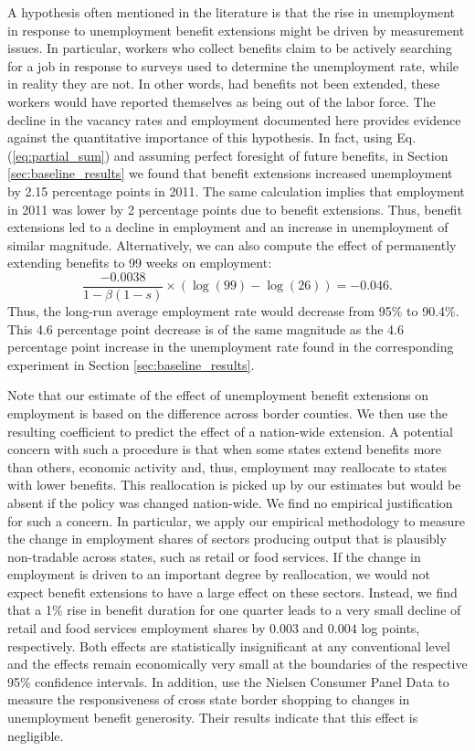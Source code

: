 \documentclass[12pt]{article}
\newcommand{\1}{\mathbf{1}}
\begin{document}
A hypothesis often mentioned in the literature is that the rise in unemployment in response to unemployment benefit extensions might be driven by measurement issues. In particular, workers who collect benefits claim to be actively searching for a job in response to surveys used to determine the unemployment rate, while in reality they are not. In other words, had benefits not been extended, these workers would have reported themselves as being out of the labor force. The decline in the vacancy rates and employment documented here provides evidence against the quantitative importance of this hypothesis.
In fact, using Eq. (\ref{eq:partial_sum}) and assuming perfect foresight of future benefits, in Section \ref{sec:baseline_results} we found that benefit extensions increased unemployment by 2.15 percentage points in 2011. The same calculation implies that employment in 2011 was lower by 2 percentage points due to benefit extensions. Thus, benefit extensions led to a decline in employment and an increase in unemployment of similar magnitude. Alternatively, we can also compute the effect  of permanently extending benefits to 99 weeks on employment:
\[
\frac{-0.0038}{1-\beta(1-s)}\times\left(\log(99)-\log(26)\right)=-0.046.
\]
Thus, the long-run average employment rate would decrease from 95\% to 90.4\%.  This 4.6 percentage point decrease is of the same magnitude as the 4.6 percentage point increase in the unemployment rate found in the corresponding experiment in Section \ref{sec:baseline_results}.


Note that our estimate of the effect of unemployment benefit extensions on employment is based on the difference across border counties. We then use the resulting coefficient to predict the effect of a nation-wide extension. A potential concern with such a procedure is that when some states extend benefits more than others, economic activity and, thus, employment may reallocate to states with lower benefits. This reallocation is picked up by our estimates but would be absent if the policy was changed nation-wide. We find no empirical justification for such a concern. In particular, we apply our empirical methodology to measure the change in employment shares of sectors producing output that is plausibly non-tradable across states, such as retail or food services. If the change in employment is driven to an important degree by reallocation, we would not expect benefit extensions to have a large effect on these sectors. Instead, we find  that a 1\% rise in benefit duration for one quarter leads to a very small decline of retail and food services employment shares by $0.003$ and $0.004$ log points, respectively. Both effects are statistically insignificant at any conventional level and the effects remain economically very small at the boundaries of the respective 95\% confidence intervals. In addition, \citet{hagedorn+handbury+manovskii:15} use the Nielsen Consumer Panel Data to measure the responsiveness of cross state border shopping to changes in unemployment benefit generosity. Their results indicate that this effect is negligible.
\end{document}
